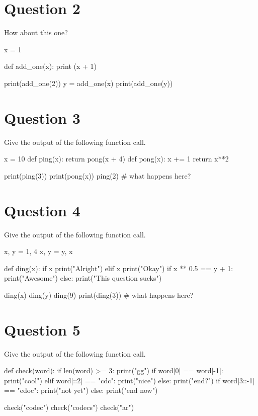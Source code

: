 \section{Question 2}
How about this one?
\begin{python}
x = 1

def add_one(x):
    print (x + 1)

print(add_one(2))
y = add_one(x)
print(add_one(y))
\end{python}

\section{Question 3}
Give the output of the following function call.
\begin{python}
x = 10
def ping(x):
    return pong(x + 4)
def pong(x):
    x += 1
    return x**2
  
print(ping(3))
print(pong(x))
ping(2) # what happens here?
\end{python}

\section{Question 4}
Give the output of the following function call.
\begin{python}
x, y = 1, 4
x, y = y, x

def ding(x):
    if x %
        print("Alright")
    elif x %
        print("Okay")
    if x ** 0.5 == y + 1:
        print("Awesome")
    else:
        print("This question sucks")

ding(x)
ding(y)
ding(9)
print(ding(3))  # what happens here?
\end{python}

\section{Question 5}
Give the output of the following function call.
\begin{python}
def check(word):
    if len(word) >= 3:
        print("gg")
    if word[0] == word[-1]:
        print("cool")
    elif word[::2] == "cdc":
        print("nice")
    else:
        print("end?")
    if word[3::-1] == "edoc":
        print("not yet")
    else:
        print("end now")
    
check("codec")
check("codecs")
check("ar")
\end{python}

